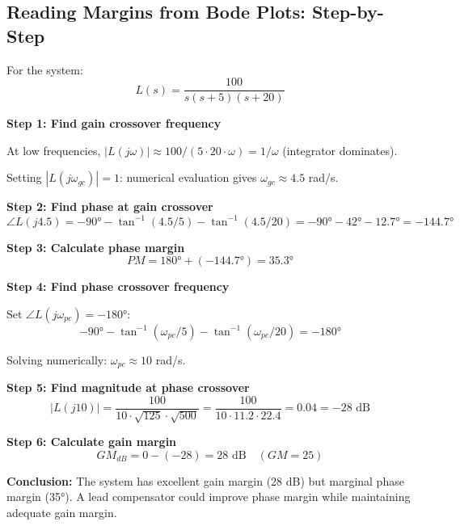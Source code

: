 
\subsection{Reading Margins from Bode Plots: Step-by-Step}

\begin{example}
\label{ex:bode_margins}
For the system:
\begin{equation}
L(s) = \frac{100}{s(s+5)(s+20)}
\end{equation}

\textbf{Step 1: Find gain crossover frequency}

At low frequencies, $|L(j\omega)| \approx 100/(5 \cdot 20 \cdot \omega) = 1/\omega$ (integrator dominates).

Setting $|L(j\omega_{gc})| = 1$: numerical evaluation gives $\omega_{gc} \approx 4.5$ rad/s.

\textbf{Step 2: Find phase at gain crossover}
\begin{equation}
\angle L(j4.5) = -90° - \tan^{-1}(4.5/5) - \tan^{-1}(4.5/20) = -90° - 42° - 12.7° = -144.7°
\end{equation}

\textbf{Step 3: Calculate phase margin}
\begin{equation}
PM = 180° + (-144.7°) = 35.3°
\end{equation}

\textbf{Step 4: Find phase crossover frequency}

Set $\angle L(j\omega_{pc}) = -180°$:
\begin{equation}
-90° - \tan^{-1}(\omega_{pc}/5) - \tan^{-1}(\omega_{pc}/20) = -180°
\end{equation}

Solving numerically: $\omega_{pc} \approx 10$ rad/s.

\textbf{Step 5: Find magnitude at phase crossover}
\begin{equation}
|L(j10)| = \frac{100}{10 \cdot \sqrt{125} \cdot \sqrt{500}} = \frac{100}{10 \cdot 11.2 \cdot 22.4} = 0.04 = -28 \text{ dB}
\end{equation}

\textbf{Step 6: Calculate gain margin}
\begin{equation}
GM_{dB} = 0 - (-28) = 28 \text{ dB} \quad (GM = 25)
\end{equation}

\textbf{Conclusion:} The system has excellent gain margin (28 dB) but marginal phase margin (35°). A lead compensator could improve phase margin while maintaining adequate gain margin.
\end{example}

